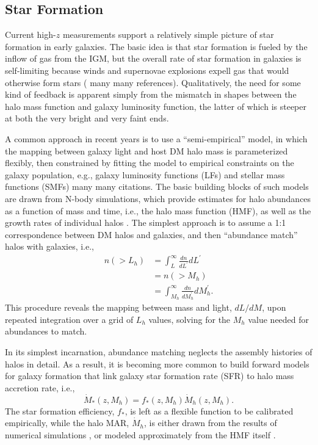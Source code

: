 \subsection{Star Formation} \label{sec:sfe}
Current high-$z$ measurements support a relatively simple picture of star formation in early galaxies. The basic idea is that star formation is fueled by the inflow of gas from the IGM, but the overall rate of star formation in galaxies is self-limiting because winds and supernovae explosions expell gas that would otherwise form stars ({\color{red} many many references}). Qualitatively, the need for some kind of feedback is apparent simply from the mismatch in shapes between the halo mass function and galaxy luminosity function, the latter of which is steeper at both the very bright and very faint ends. 

A common approach in recent years is to use a ``semi-empirical'' model, in which the mapping between galaxy light and host DM halo mass is parameterized flexibly, then constrained by fitting the model to empirical constraints on the galaxy population, e.g., galaxy luminosity functions (LFs) and stellar mass functions (SMFs) {\color{red} many many citations}. The basic building blocks of such models are drawn from N-body simulations, which provide estimates for halo abundances as a function of mass and time, i.e., the halo mass function (HMF), as well as the growth rates of individual halos \cite{McBride2009}. The simplest approach is to assume a 1:1 correspondence between DM halos and galaxies, and then ``abundance match'' halos with galaxies, i.e.,
\begin{align}
	n(>L_h) & = \int_L^{\infty} \frac{dn}{dL^{\prime}} dL^{\prime} \nonumber \\
	& = n(>M_h)  \nonumber \\
	& = \int_{M_h}^{\infty} \frac{dn}{dM_h^{\prime}} dM_h^{\prime} .
\end{align}
This procedure reveals the mapping between mass and light, $dL/dM$, upon repeated integration over a grid of $L_h$ values, solving for the $M_h$ value needed for abundances to match.

In its simplest incarnation, abundance matching neglects the assembly histories of halos in detail. As a result, it is becoming more common to build forward models for galaxy formation that link galaxy star formation rate (SFR) to halo mass accretion rate, i.e.,
\begin{equation}
	\dot{M}_{\ast}(z,M_h) = f_{\ast}(z,M_h) \dot{M}_h (z,M_h) . \label{eq:SFE}
\end{equation}
The star formation efficiency, $f_{\ast}$, is left as a flexible function to be calibrated empirically, while the halo MAR, $\dot{M}_h$, is either drawn from the results of numerical simulations \cite{McBride2009,Trac2015}, or modeled approximately from the HMF itself \cite{Furlanetto2017}. 

